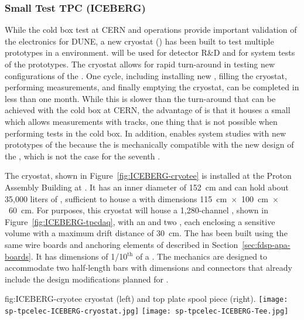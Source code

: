 \subsubsection{Small Test TPC (ICEBERG)}
\label{sec:fdsp-tpcelec-qa-facilities-testtpc}

While the cold box test at CERN and  operations provide important 
validation of the  electronics for DUNE, a new cryostat () 
has been built to test multiple  prototypes in a  environment.
 will be used for 
 detector R\&D and for system tests of the  prototypes. 
The  cryostat allows for rapid turn-around in testing new configurations
of the . One cycle, including installing new , filling the cryostat,
performing measurements, and finally emptying the cryostat, can be completed in less than
one month. While this is slower than the turn-around that can be achieved with the
cold box at CERN, the advantage of  is that it houses a small  which
allows measurements with tracks, one thing that is not possible when performing
tests in the cold box. In addition,  enables system studies with new
prototypes of the  because the  is mechanically compatible with the 
new design of the , which is not the case for the seventh  .  

The  cryostat, shown in Figure~\ref{fig:ICEBERG-cryotee} is installed
at the Proton Assembly Building at . It has an inner diameter of \SI{152}{cm}
and can hold about 35,000 liters of , sufficient to house a
 with dimensions \SI{115}{cm}~$\times$~\SI{100}{cm}~$\times$~\SI{60}{cm}. For
 purposes, this cryostat will house a 1,280-channel , shown in
Figure~\ref{fig:ICEBERG-tpcdaq}, with an  and two , each 
enclosing a sensitive volume with a maximum drift distance of \SI{30}{cm}. The  
has been built using the same wire boards and anchoring elements of  
described in Section~\ref{sec:fdsp-apa-boards}. It has dimensions of 
1/10$^{\mathrm{th}}$ of a  . The  mechanics are designed to
accommodate two half-length  bars with dimensions and connectors that already 
include the design modifications planned for .

\begin{dunefigure}
{fig:ICEBERG-cryotee}
{ cryostat (left) and top plate spool piece (right).}
\texttt{[image: sp-tpcelec-ICEBERG-cryostat.jpg]}
\texttt{[image: sp-tpcelec-ICEBERG-Tee.jpg]}
\end{dunefigure}


